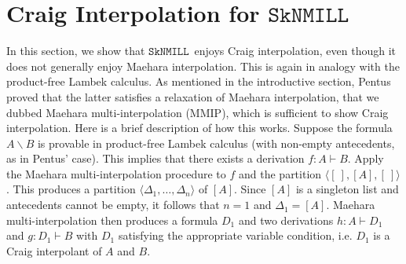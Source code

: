 \documentclass[sn-mathphys-num]{sn-jnl}%
\newcommand{\GD}{\Delta}
\newcommand{\vd}{\vdash}
\newcommand{\bsls}{\backslash}
\newcommand{\SkNMILL}{$\mathtt{SkNMILL}$}
\newcommand{\mf}[1]{\mathsf{#1}}
\newcommand{\vars}[1]{\mf{var} (#1)}
\newcommand{\MMIP}{\textsf{MMIP}}
\theoremstyle{thmstyleone}%
\theoremstyle{thmstyletwo}%
\theoremstyle{thmstylethree}%
\begin{document}
\section{Craig Interpolation for \SkNMILL}\label{sec:interpolation}

In this section, we show that \SkNMILL~enjoys Craig interpolation, even though it does not generally enjoy Maehara interpolation.
This is again in analogy with the product-free Lambek calculus. 
As mentioned in the introductive section, Pentus \cite{Pentus1997} proved that the latter satisfies a relaxation of Maehara interpolation, that we dubbed Maehara multi-interpolation (\MMIP), which is sufficient to show Craig interpolation. 
Here is a brief description of how this works.
Suppose the formula $A \bsls B$ is provable in product-free Lambek calculus (with non-empty antecedents, as in Pentus' case).
This implies that there exists a derivation $f : A \vd B$.
Apply the Maehara multi-interpolation procedure to $f$ and the partition $\langle [\ ],[A],[\ ]\rangle$.
This produces a partition $\langle \GD_1,\dots,\GD_n \rangle$ of $[A]$.
Since $[A]$ is a singleton list and antecedents cannot be empty, it follows that $n = 1$ and $\GD_1 = [ A ]$.
Maehara multi-interpolation then produces a formula $D_1$ and two derivations $h : A \vd D_1$ and $g : D_1 \vd B$ with $D_1$ satisfying the appropriate variable condition, i.e. $D_1$ is a Craig interpolant of $A$ and $B$.

\end{document}
